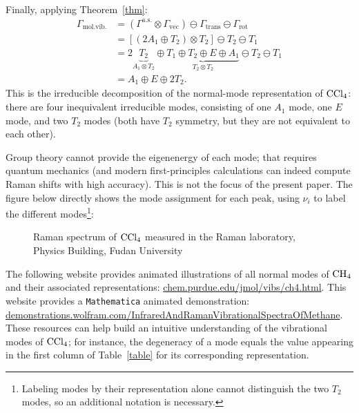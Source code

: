 \documentclass[lang=en, column=onecolumn, mathfont=times]{spArticle}
\begin{document}
Finally, applying Theorem~\ref{thm}:
$$
\begin{aligned}
    \Gamma _{\mathrm{mol}.\mathrm{vib}.}&=\left( \Gamma ^{\mathrm{a}.\mathrm{s}.}\otimes \Gamma _{\mathrm{vec}} \right) \ominus \Gamma _{\mathrm{trans}}\ominus \Gamma _{\mathrm{rot}}
    \\
    &=\left[ \left( 2A_1\oplus T_2 \right) \otimes T_2 \right] \ominus T_2\ominus T_1
    \\
    &=2\underset{A_1\otimes T_2}{\underbrace{T_2}}\oplus \underset{T_2\otimes T_2}{\underbrace{T_1\oplus T_2\oplus E\oplus A_1}}\ominus T_2\ominus T_1
    \\
    &=A_1\oplus E\oplus 2T_2.
\end{aligned}
$$
This is the irreducible decomposition of the normal-mode representation of $\ce{CCl4}$: there are four inequivalent irreducible modes, consisting of one $A_1$ mode, one $E$ mode, and two $T_2$ modes (both have $T_2$ symmetry, but they are not equivalent to each other).

Group theory cannot provide the eigenenergy of each mode; that requires quantum mechanics (and modern first-principles calculations can indeed compute Raman shifts with high accuracy). This is not the focus of the present paper. The figure below directly shows the mode assignment for each peak, using $\nu_i$ to label the different modes\footnote{Labeling modes by their representation alone cannot distinguish the two $T_2$ modes, so an additional notation is necessary.}:

\begin{figure}[H]
    \centering
    \resizebox{0.85\linewidth}{!}{}
    \caption{Raman spectrum of $\ce{CCl4}$ measured in the Raman laboratory, Physics Building, Fudan University}
\end{figure}

The following website provides animated illustrations of all normal modes of $\ce{CH_4}$ and their associated representations: \href{https://www.chem.purdue.edu/jmol/vibs/ch4.html}{chem.purdue.edu/\allowbreak jmol/vibs/ch4.html}. This website provides a \texttt{Mathematica} animated demonstration: \href{https://demonstrations.wolfram.com/InfraredAndRamanVibrationalSpectraOfMethane/?utm_source}{demonstrations.wolfram.com/InfraredAndRamanVibrationalSpectraOfMethane}. These resources can help build an intuitive understanding of the vibrational modes of $\ce{CCl4}$; for instance, the degeneracy of a mode equals the value appearing in the first column of Table~\ref{table} for its corresponding representation.
\end{document}
